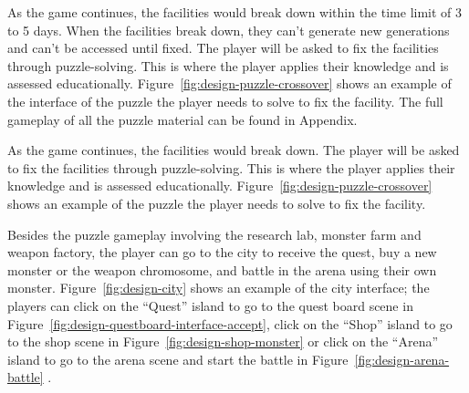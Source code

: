 \documentclass[12pt,oneside,openright,a4paper]{cpe-english-project}
\begin{document}
\begin{itemize}
As the game continues, the facilities would break down within the time limit of 3 to 5 days. When the facilities break down, they can’t generate new generations and can’t be accessed until fixed. The player will be asked to fix the facilities through puzzle-solving. This is where the player applies their knowledge and is assessed educationally. Figure~\ref{fig:design-puzzle-crossover} shows an example of the interface of the puzzle the player needs to solve to fix the facility. The full gameplay of all the puzzle material can be found in Appendix. %


As the game continues, the facilities would break down. The player will be asked to fix the facilities through puzzle-solving. This is where the player applies their knowledge and is assessed educationally. Figure~\ref{fig:design-puzzle-crossover} shows an example of the puzzle the player needs to solve to fix the facility.

\begin{minipage}[c]{\textwidth}\centering
{}
\label{fig:design-puzzle-crossover}
\end{minipage}

Besides the puzzle gameplay involving the research lab, monster farm and weapon factory, the player can go to the city to receive the quest, buy a new monster or the weapon chromosome, and battle in the arena using their own monster. Figure~\ref{fig:design-city} shows an example of the city interface; the players can click on the “Quest” island to go to the quest board scene in Figure~\ref{fig:design-questboard-interface-accept}, click on the “Shop” island to go to the shop scene in Figure~\ref{fig:design-shop-monster} or click on the “Arena” island to go to the arena scene and start the battle in Figure~\ref{fig:design-arena-battle} .


\end{itemize}
\end{document}
